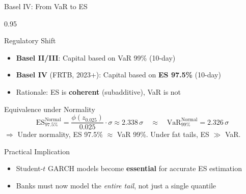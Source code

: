 \documentclass[9pt, aspectratio=169, t]{beamer}
\begin{document}
\begin{frame}{Basel IV: From VaR to ES}
    \begin{cminipage}{0.95\textwidth}
    \small
    \begin{block}{Regulatory Shift}
        \begin{itemize}\setlength{\itemsep}{0pt}
            \item \textbf{Basel II/III}: Capital based on VaR 99\% (10-day)
            \item \textbf{Basel IV} (FRTB, 2023+): Capital based on \textbf{ES 97.5\%} (10-day)
            \item Rationale: ES is \textbf{coherent} (subadditive), VaR is not
        \end{itemize}
    \end{block}
    \vspace{-0.1cm}
    \begin{exampleblock}{Equivalence under Normality}
        \[
            \text{ES}_{97.5\%}^{\text{Normal}} = \frac{\phi(z_{0.025})}{0.025} \cdot \sigma \approx 2.338\,\sigma \quad \approx \quad \text{VaR}_{99\%}^{\text{Normal}} = 2.326\,\sigma
        \]
        $\Rightarrow$ Under normality, ES 97.5\% $\approx$ VaR 99\%. Under fat tails, ES $\gg$ VaR.
    \end{exampleblock}
    \vspace{-0.1cm}
    \begin{alertblock}{Practical Implication}
        \begin{itemize}\setlength{\itemsep}{0pt}
            \item Student-$t$ GARCH models become \textbf{essential} for accurate ES estimation
            \item Banks must now model the \textit{entire tail}, not just a single quantile
        \end{itemize}
    \end{alertblock}
    \end{cminipage}
\end{frame}

\end{document}
